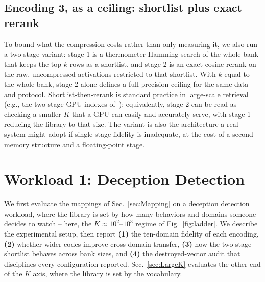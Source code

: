 \documentclass[conference]{IEEEtran}
\begin{document}
\subsection{Encoding 3, as a ceiling: shortlist plus exact rerank}
\label{subsec:TwoStage}
To bound what the compression costs rather than only measuring it, we
also run a two-stage variant: stage 1 is a thermometer-Hamming search of
the whole bank that keeps the top $k$ rows as a shortlist, and stage 2
is an exact cosine rerank on the raw, uncompressed activations
restricted to that shortlist. With $k$ equal to the whole bank, stage 2
alone defines a full-precision ceiling for the same data and protocol.
Shortlist-then-rerank is standard practice in large-scale retrieval
(e.g., the two-stage GPU indexes of~\cite{faisscuvs2025});
equivalently, stage 2 can be read as checking a smaller $K$ that a
GPU can easily and accurately serve, with stage 1 reducing the
library to that size. The variant is also the architecture a real
system might adopt if
single-stage fidelity is inadequate, at the cost of a second memory
structure and a floating-point stage.

\section{Workload 1: Deception Detection}
\label{sec:Results}

We first evaluate the mappings of Sec.~\ref{sec:Mapping} on a
deception detection workload, where the
library is set by how many behaviors and domains someone decides to
watch -- here, the $K\approx10^{2}$--$10^{3}$ regime of
Fig.~\ref{fig:ladder}. We describe the experimental setup, then
report {\bf (1)} the ten-domain fidelity of each encoding, {\bf (2)}
whether wider codes improve cross-domain transfer, {\bf (3)} how the
two-stage shortlist behaves across bank sizes, and {\bf (4)} the
destroyed-vector audit that disciplines every configuration reported.
Sec.~\ref{sec:LargeK} evaluates the other end of the $K$ axis, where
the library is set by the vocabulary.
\end{document}

